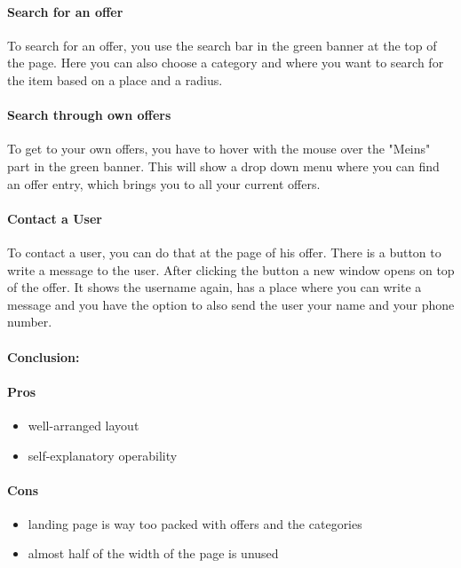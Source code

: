 		\paragraph{Search for an offer}
		To search for an offer, you use the search bar in the green banner at the top of the page. Here you can also choose a category and where you want to search for the item based on a place and a radius.
		
		\paragraph{Search through own offers}
		To get to your own offers, you have to hover with the mouse over the "Meins" part in the green banner. This will show a drop down menu where you can find an offer entry, which brings you to all your current offers.
		
		\paragraph{Contact a User}
		To contact a user, you can do that at the page of his offer. There is a button to write a message to the user. After clicking the button a new window opens on top of the offer. It shows the username again, has a place where you can write a message and you have the option to also send the user your name and your phone number.
		
		\paragraph{Conclusion:}
		
		\paragraph{Pros}
		\begin{itemize}
			\item well-arranged layout
			\item self-explanatory operability
		\end{itemize}
		
		\paragraph{Cons}
		\begin{itemize}
			\item landing page is way too packed with offers and the categories
			\item almost half of the width of the page is unused
		\end{itemize}
	

